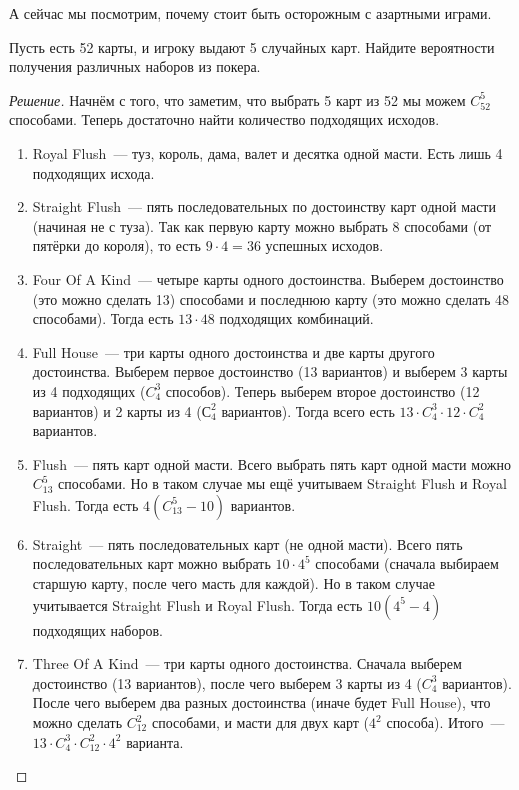 \documentclass[a4paper,12pt]{article}
\begin{document}
А сейчас мы посмотрим, почему стоит быть осторожным с азартными играми.
\begin{problem}
	Пусть есть 52 карты, и игроку выдают 5 случайных карт. Найдите вероятности получения различных наборов из покера.
\end{problem}
\begin{proof}[Решение]
	Начнём с того, что заметим, что выбрать 5 карт из 52 мы можем \(C_{52}^{5}\) способами. Теперь достаточно найти количество подходящих исходов.
	\begin{enumerate}
		\item Royal Flush~--- туз, король, дама, валет и десятка одной масти. Есть лишь 4 подходящих исхода.
		\item Straight Flush~--- пять последовательных по достоинству карт одной масти (начиная не с туза). Так как первую карту можно выбрать 8 способами (от пятёрки до короля), то есть \(9 \cdot 4 = 36\) успешных исходов.
		\item Four Of A Kind~--- четыре карты одного достоинства. Выберем достоинство (это можно сделать 13) способами и последнюю карту (это можно сделать 48 способами). Тогда есть \(13 \cdot 48\) подходящих комбинаций.
		\item Full House~--- три карты одного достоинства и две карты другого достоинства. Выберем первое достоинство (13 вариантов) и выберем 3 карты из 4 подходящих (\(C_{4}^{3}\) способов). Теперь выберем второе достоинство (12 вариантов) и 2 карты из 4 (\(С_{4}^{2}\) вариантов). Тогда всего есть \(13 \cdot C_{4}^{3} \cdot 12 \cdot C_{4}^{2}\) вариантов.
		\item Flush~--- пять карт одной масти. Всего выбрать пять карт одной масти можно \(C_{13}^{5}\) способами. Но в таком случае мы ещё учитываем Straight Flush и Royal Flush. Тогда есть \(4(C_{13}^{5} - 10)\) вариантов.
		\item Straight~--- пять последовательных карт (не одной масти). Всего пять последовательных карт можно выбрать \(10 \cdot 4^5\) способами (сначала выбираем старшую карту, после чего масть для каждой). Но в таком случае учитывается Straight Flush и Royal Flush. Тогда есть \(10(4^5 - 4)\) подходящих наборов.
		\item Three Of A Kind~--- три карты одного достоинства. Сначала выберем достоинство (13 вариантов), после чего выберем 3 карты из 4 (\(C_{4}^{3}\) вариантов). После чего выберем два разных достоинства (иначе будет Full House), что можно сделать \(C_{12}^{2}\) способами, и масти для двух карт (\(4^2\) способа). Итого~--- \(13 \cdot C_{4}^{3} \cdot C_{12}^{2} \cdot 4^2\) варианта.

\end{enumerate}
\end{proof}
\end{document}
